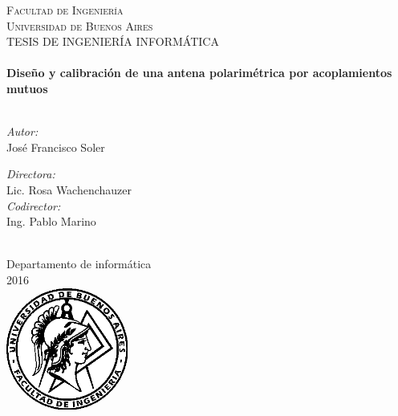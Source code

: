 \documentclass[11pt, oneside]{Thesis} %
\begin{document}
\begin{titlepage}
\begin{center}

\textsc{\LARGE Facultad de Ingeniería \\ Universidad de Buenos Aires}\\[1.5cm] %
\textsc{\Large TESIS DE INGENIERÍA INFORMÁTICA}\\[0.5cm] %

\HRule \\[0.4cm] %
{\huge \bfseries Diseño y calibración de una antena polarimétrica por acoplamientos mutuos}\\[0.4cm] %
\HRule \\[1.5cm] %

\begin{minipage}{0.4\textwidth}
\begin{flushleft} \large
\emph{Autor:}\\
{José Francisco Soler} %
\end{flushleft}
\end{minipage}
\begin{minipage}{0.4\textwidth}
\begin{flushright} \large
\emph{Directora:} \\
{Lic. Rosa Wachenchauzer} \\
\emph{Codirector:} \\
{Ing. Pablo Marino} %
\end{flushright}
\end{minipage}\\[3cm]

Departamento de informática\\
2016\\[2cm] %

\includegraphics[width=4cm]{Logo2.png} %

\vfill
\end{center}

\end{titlepage}
\end{document}
